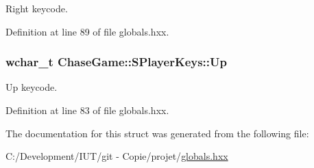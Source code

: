 Right keycode. 



Definition at line 89 of file globals.\-hxx.

\hypertarget{struct_chase_game_1_1_s_player_keys_a0153d90bee31d3959e7a79377c4dd927}{
\subsubsection[{Up}]{\setlength{\rightskip}{0pt plus 5cm}wchar\-\_\-t Chase\-Game\-::\-S\-Player\-Keys\-::\-Up}}\label{struct_chase_game_1_1_s_player_keys_a0153d90bee31d3959e7a79377c4dd927}


Up keycode. 



Definition at line 83 of file globals.\-hxx.



The documentation for this struct was generated from the following file\-:\begin{DoxyCompactItemize}
\item 
C\-:/\-Development/\-I\-U\-T/git -\/ Copie/projet/\hyperlink{globals_8hxx}{globals.\-hxx}\end{DoxyCompactItemize}
